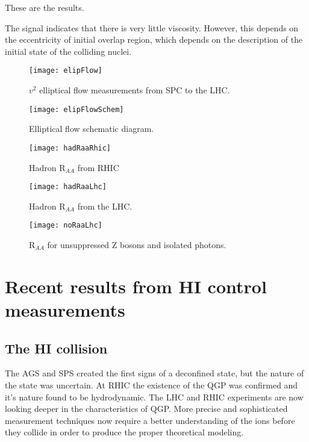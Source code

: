     These are the results. 

    The signal indicates that there is very little viscosity. 
    However, this depends on the eccentricity of initial overlap region, which
      depends on the description of the initial state of the colliding nuclei.

    \begin{figure}[!Hhbt]
      \centering
      \texttt{[image: elipFlow]}
      \caption{ $v^{2}$ elliptical flow measurements from SPC to the LHC.}
      \label{fig:elipFlow}
    \end{figure}

     \begin{figure}[!Hhbt]
      \centering
      \texttt{[image: elipFlowSchem]}
      \caption{ Elliptical flow schematic diagram.}
      \label{fig:elipFlowSchem}
    \end{figure}

    \begin{figure}[!Hhbt]
      \centering
      \texttt{[image: hadRaaRhic]}
      \caption{Hadron R$_{AA}$ from RHIC}
      \label{fig:hadRaaRhic}
    \end{figure}

    \begin{figure}[!Hhbt]
      \centering
      \texttt{[image: hadRaaLhc]}
      \caption{Hadron R$_{AA}$ from the LHC.}
      \label{fig:hadRaaLhc}
    \end{figure}

    \begin{figure}[!Hhbt]
      \centering
      \texttt{[image: noRaaLhc]}
      \caption{R$_{AA}$ for unsuppressed Z bosons and isolated photons.}
      \label{fig:noRaaLhc}
    \end{figure}

  \section{Recent results from HI control measurements}

    \subsection{The HI collision}
      The AGS and SPS created the first signs of a deconfined state, but the 
        nature of the state was uncertain.
      At RHIC the existence of the QGP was confirmed and it's nature found to 
        be hydrodynamic.
      The LHC and RHIC experiments are now looking deeper in the characteristics
        of QGP.
      More precise and sophisticated measurement techniques now require a 
        better understanding of the ions before they collide in order to 
        produce the proper theoretical modeling. 

